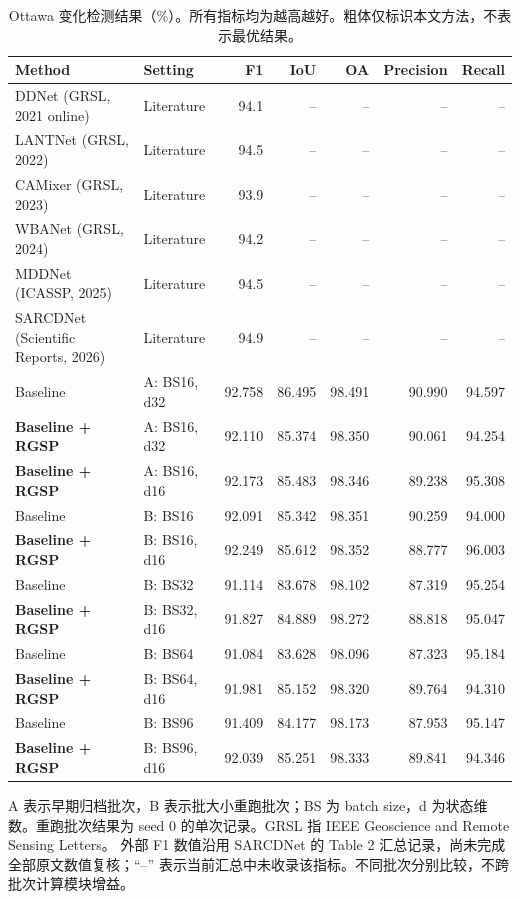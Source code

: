 \documentclass[journal]{IEEEtran}
\begin{document}
\begin{table}[!t]
\centering
\scriptsize
\setlength{\tabcolsep}{2pt}
\renewcommand{\arraystretch}{1.12}
\caption{Ottawa 变化检测结果（\%）。所有指标均为越高越好。粗体仅标识本文方法，不表示最优结果。}
\label{tab:ottawa_comparison}
\begin{tabularx}{\linewidth}{@{}Xlrrrrr@{}}
\toprule
Method & Setting & F1 & IoU & OA & Precision & Recall \\
\midrule
DDNet (GRSL, 2021 online)
& Literature & 94.1 & -- & -- & -- & -- \\
LANTNet (GRSL, 2022)
& Literature & 94.5 & -- & -- & -- & -- \\
CAMixer (GRSL, 2023)
& Literature & 93.9 & -- & -- & -- & -- \\
WBANet (GRSL, 2024)
& Literature & 94.2 & -- & -- & -- & -- \\
MDDNet (ICASSP, 2025)
& Literature & 94.5 & -- & -- & -- & -- \\
SARCDNet (Scientific Reports, 2026)
& Literature & 94.9 & -- & -- & -- & -- \\
\midrule
Baseline
& A: BS16, d32
& 92.758 & 86.495 & 98.491 & 90.990 & 94.597 \\
\textbf{Baseline + RGSP}
& A: BS16, d32
& 92.110 & 85.374 & 98.350 & 90.061 & 94.254 \\
\textbf{Baseline + RGSP}
& A: BS16, d16
& 92.173 & 85.483 & 98.346 & 89.238 & 95.308 \\
\midrule
Baseline
& B: BS16
& 92.091 & 85.342 & 98.351 & 90.259 & 94.000 \\
\textbf{Baseline + RGSP}
& B: BS16, d16
& 92.249 & 85.612 & 98.352 & 88.777 & 96.003 \\
Baseline
& B: BS32
& 91.114 & 83.678 & 98.102 & 87.319 & 95.254 \\
\textbf{Baseline + RGSP}
& B: BS32, d16
& 91.827 & 84.889 & 98.272 & 88.818 & 95.047 \\
Baseline
& B: BS64
& 91.084 & 83.628 & 98.096 & 87.323 & 95.184 \\
\textbf{Baseline + RGSP}
& B: BS64, d16
& 91.981 & 85.152 & 98.320 & 89.764 & 94.310 \\
Baseline
& B: BS96
& 91.409 & 84.177 & 98.173 & 87.953 & 95.147 \\
\textbf{Baseline + RGSP}
& B: BS96, d16
& 92.039 & 85.251 & 98.333 & 89.841 & 94.346 \\
\bottomrule
\end{tabularx}
\smallskip
\begin{minipage}{\linewidth}
\footnotesize
A 表示早期归档批次，B 表示批大小重跑批次；BS 为 batch size，d 为状态维数。重跑批次结果为 seed 0 的单次记录。GRSL 指 IEEE Geoscience and Remote Sensing Letters。
外部 F1 数值沿用 SARCDNet 的 Table 2 汇总记录\cite{sarcdnet2026}，尚未完成全部原文数值复核；``--'' 表示当前汇总中未收录该指标。不同批次分别比较，不跨批次计算模块增益。
\end{minipage}
\end{table}
\end{document}
